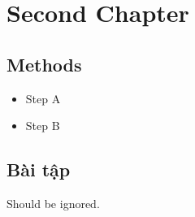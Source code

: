 \chapter{Second Chapter}
\section{Methods}
\begin{itemize}
\item Step A
\item Step B
\end{itemize}
\section*{Bài tập}
Should be ignored.
